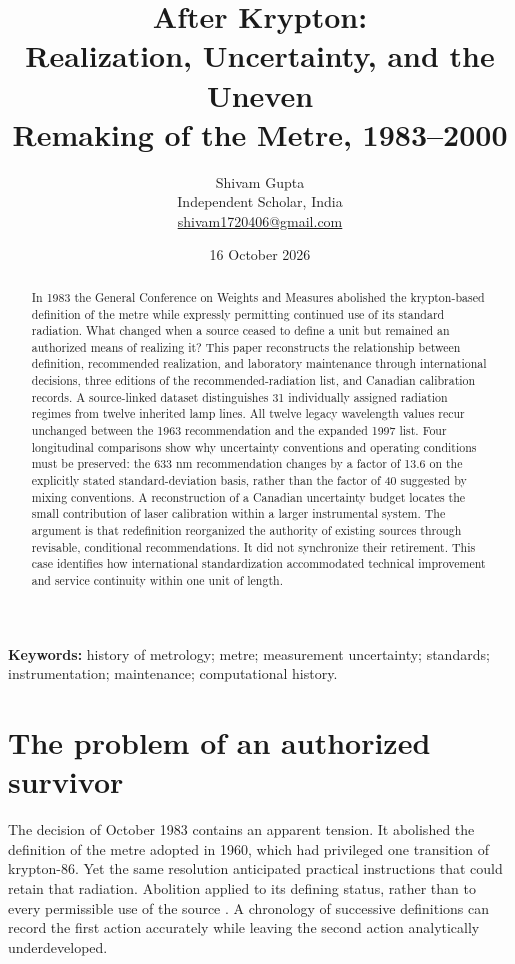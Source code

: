 \documentclass[11pt,a4paper]{article}
\title{After Krypton:\\Realization, Uncertainty, and the Uneven\\Remaking of the Metre, 1983--2000}
\author{Shivam Gupta\\\small Independent Scholar, India\\\small\href{mailto:shivam1720406@gmail.com}{shivam1720406@gmail.com}}
\date{16 October 2026}
\begin{document}
\maketitle
\begin{abstract}
In 1983 the General Conference on Weights and Measures abolished the krypton-based definition of the metre while expressly permitting continued use of its standard radiation. What changed when a source ceased to define a unit but remained an authorized means of realizing it? This paper reconstructs the relationship between definition, recommended realization, and laboratory maintenance through international decisions, three editions of the recommended-radiation list, and Canadian calibration records. A source-linked dataset distinguishes 31 individually assigned radiation regimes from twelve inherited lamp lines. All twelve legacy wavelength values recur unchanged between the 1963 recommendation and the expanded 1997 list. Four longitudinal comparisons show why uncertainty conventions and operating conditions must be preserved: the 633 nm recommendation changes by a factor of 13.6 on the explicitly stated standard-deviation basis, rather than the factor of 40 suggested by mixing conventions. A reconstruction of a Canadian uncertainty budget locates the small contribution of laser calibration within a larger instrumental system. The argument is that redefinition reorganized the authority of existing sources through revisable, conditional recommendations. It did not synchronize their retirement. This case identifies how international standardization accommodated technical improvement and service continuity within one unit of length.
\end{abstract}
\noindent\textbf{Keywords:} history of metrology; metre; measurement uncertainty; standards; instrumentation; maintenance; computational history.

\section{The problem of an authorized survivor}
The decision of October 1983 contains an apparent tension. It abolished the definition of the metre adopted in 1960, which had privileged one transition of krypton-86. Yet the same resolution anticipated practical instructions that could retain that radiation. Abolition applied to its defining status, rather than to every permissible use of the source \citep{cgpm1983}. A chronology of successive definitions can record the first action accurately while leaving the second action analytically underdeveloped.
\end{document}
